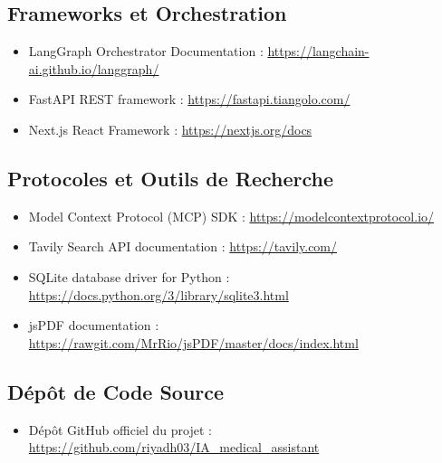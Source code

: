 \documentclass[11pt,a4paper]{report}
\begin{document}
\subsection*{Frameworks et Orchestration}
\begin{itemize}
    \item LangGraph Orchestrator Documentation : \url{https://langchain-ai.github.io/langgraph/}
    \item FastAPI REST framework : \url{https://fastapi.tiangolo.com/}
    \item Next.js React Framework : \url{https://nextjs.org/docs}
\end{itemize}

\subsection*{Protocoles et Outils de Recherche}
\begin{itemize}
    \item Model Context Protocol (MCP) SDK : \url{https://modelcontextprotocol.io/}
    \item Tavily Search API documentation : \url{https://tavily.com/}
    \item SQLite database driver for Python : \url{https://docs.python.org/3/library/sqlite3.html}
    \item jsPDF documentation : \url{https://rawgit.com/MrRio/jsPDF/master/docs/index.html}
\end{itemize}

\subsection*{Dépôt de Code Source}
\begin{itemize}
    \item Dépôt GitHub officiel du projet : \url{https://github.com/riyadh03/IA_medical_assistant}
\end{itemize}
\end{document}

